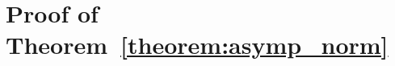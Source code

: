 \documentclass[12pt]{article}
\def\bse{\begin{eqnarray*}}
\def\ese{\end{eqnarray*}}
\def\bse{\begin{eqnarray*}}
\def\ese{\end{eqnarray*}}
\def\bS{{\mathbf S}}
\def\bzero{{\mathbf 0}}
\def\bbeta{{\boldsymbol{\beta}}}
\def\bzero{{\boldsymbol{0}}}
\def\bD{{\boldsymbol D}}
\def\bS{{\boldsymbol S}}
\def\bT{{\boldsymbol T}}
\def\bY{{\boldsymbol Y}}
\def\bZ{{\boldsymbol Z}}
\def\tilD{\bD}
\def\E{\rm E}
\begin{document}


\section{Proof of Theorem~\ref{theorem:asymp_norm}}
\label{sec:asymp_norm_proof}
\end{document}
